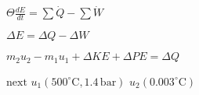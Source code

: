 \( \Theta \frac{dE}{dt} = \sum \dot{Q} - \sum \dot{W} \)  

\( \Delta E = \Delta Q - \Delta W \)  

\( m_2 u_2 - m_1 u_1 + \Delta KE + \Delta PE = \Delta Q \)  

\( \text{next } u_1 (500^\circ \text{C}, 1.4 \, \text{bar}) \)  
\( u_2 (0.003^\circ \text{C}) \)